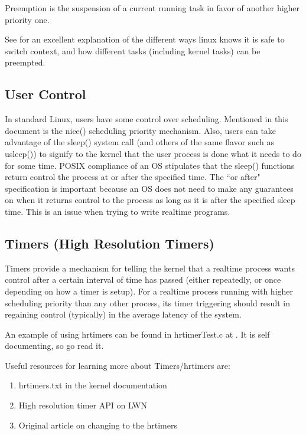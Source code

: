 \documentclass{article}
\begin{document}
Preemption is the suspension of a current running task in favor of another higher priority one.

See \cite{LinuxProcessSwitch} for an excellent explanation of the different ways linux knows it is safe to switch context, and how different tasks (including kernel tasks) can be preempted.

\subsection{User Control}
In standard Linux, users have some control over scheduling.  Mentioned in this document is the nice() scheduling priority mechanism.  Also, users can take advantage of the sleep() system call (and others of the same flavor such as usleep()) to signify to the kernel that the user process is done what it needs to do for some time.  POSIX compliance of an OS stipulates that the sleep() functions return control the process at or after the specified time.  The ``or after" specification is important because an OS does not need to make any guarantees on when it returns control to the process as long as it is after the specified sleep time.  This is an issue when trying to write realtime programs.

\subsection{Timers (High Resolution Timers)}
Timers provide a mechanism for telling the kernel that a realtime process wants control after a certain interval of time has passed (either repeatedly, or once depending on how a timer is setup).  For a realtime process running with higher scheduling priority than any other process, its timer triggering should result in regaining control (typically) in the average latency of the system.

An example of using hrtimers can be found in hrtimerTest.c at \cite{hrtimerTest}.  It is self documenting, so go read it.

Useful resources for learning more about Timers/hrtimers are:
\begin{enumerate}
\item hrtimers.txt in the kernel documentation \cite{highResTimerDoc}
\item High resolution timer API on LWN \cite{highResTimerAPI}
\item Original article on changing to the hrtimers \cite{newApproachToKernelTimers}
\end{enumerate}
\end{document}
